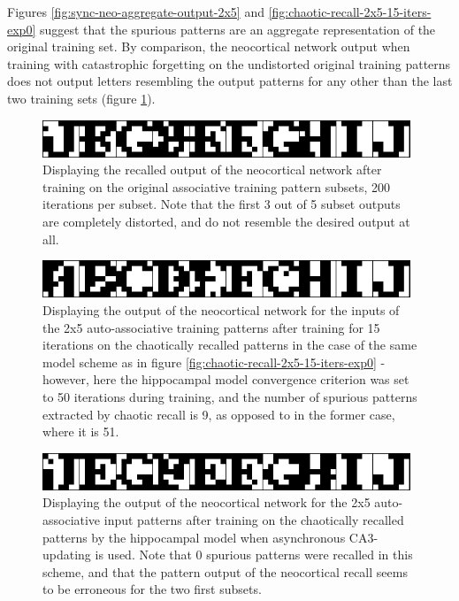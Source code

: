 Figures \ref{fig:sync-neo-aggregate-output-2x5} and \ref{fig:chaotic-recall-2x5-15-iters-exp0} suggest that the spurious patterns are an aggregate representation of the original training set. By comparison, the neocortical network output when training with catastrophic forgetting on the undistorted original training patterns does not output letters resembling the output patterns for any other than the last two training sets (figure \ref{fig:catastrophic-forgetting-2x5-neo-consolidation}).

\begin{figure}
    \centering
    \includegraphics[width=11cm]{fig/neo-consolidation/original-training-patterns-with-catastrophic-forgetting-2x5-200-neo-iterations}
    \caption{Displaying the recalled output of the neocortical network after training on the original associative training pattern subsets, 200 iterations per subset. Note that the first 3 out of 5 subset outputs are completely distorted, and do not resemble the desired output at all.}
    \label{fig:catastrophic-forgetting-2x5-neo-consolidation}
\end{figure}

\begin{figure}
    \centering
    \includegraphics[width=11cm]{fig/neo-consolidation/one-2x5-run-sync-50-iters-15-neo-iters}
    \caption{Displaying the output of the neocortical network for the inputs of the 2x5 auto-associative training patterns after training for 15 iterations on the chaotically recalled patterns in the case of the same model scheme as in figure \ref{fig:chaotic-recall-2x5-15-iters-exp0} - however, here the hippocampal model convergence criterion was set to 50 iterations during training, and the number of spurious patterns extracted by chaotic recall is 9, as opposed to in the former case, where it is 51.}
    \label{fig:one-2x5-run-sync-50-iters-15-neo-iters}
\end{figure}

\begin{figure}
    \centering
    \includegraphics[width=11cm]{fig/neo-consolidation/one-2x5-run-async-15-iters-200-neo-iters}
    \caption{Displaying the output of the neocortical network for the 2x5 auto-associative input patterns after training on the chaotically recalled patterns by the hippocampal model when asynchronous CA3-updating is used. Note that 0 spurious patterns were recalled in this scheme, and that the pattern output of the neocortical recall seems to be erroneous for the two first subsets.}
    \label{fig:one-2x5-run-async-15-iters-200-neo-iters}
\end{figure}

